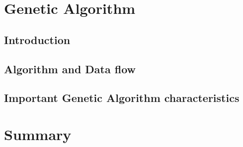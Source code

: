 \section{Genetic Algorithm}
\subsection{Introduction}
\subsection{Algorithm and Data flow}
\subsection{Important Genetic Algorithm characteristics}

\section {Summary}
